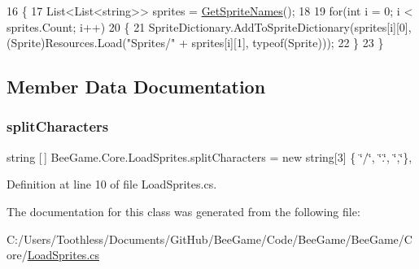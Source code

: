\begin{DoxyCode}
16         \{            
17             List<List<string>> sprites = \hyperlink{class_bee_game_1_1_core_1_1_load_sprites_a3dca64c0b272b40389047ae9722bfcd3}{GetSpriteNames}();
18             
19             \textcolor{keywordflow}{for}(\textcolor{keywordtype}{int} i = 0; i < sprites.Count; i++)
20             \{
21                 SpriteDictionary.AddToSpriteDictionary(sprites[i][0], (Sprite)Resources.Load(\textcolor{stringliteral}{"Sprites/"} + 
      sprites[i][1], typeof(Sprite)));
22             \}
23         \}
\end{DoxyCode}


\subsection{Member Data Documentation}
\mbox{\label{class_bee_game_1_1_core_1_1_load_sprites_aaef6cb35c513009a03c13d1307d5bcba}} 
\subsubsection{\texorpdfstring{split\+Characters}{splitCharacters}}
{\footnotesize\ttfamily string \mbox{[}$\,$\mbox{]} Bee\+Game.\+Core.\+Load\+Sprites.\+split\+Characters = new string\mbox{[}3\mbox{]} \{ \char`\"{}/\char`\"{}, \char`\"{}.\char`\"{}, \char`\"{},\char`\"{}\}\hspace{0.3cm}{\ttfamily [static]}, {\ttfamily [private]}}



Definition at line 10 of file Load\+Sprites.\+cs.



The documentation for this class was generated from the following file\+:\begin{DoxyCompactItemize}
\item 
C\+:/\+Users/\+Toothless/\+Documents/\+Git\+Hub/\+Bee\+Game/\+Code/\+Bee\+Game/\+Bee\+Game/\+Core/\hyperlink{_load_sprites_8cs}{Load\+Sprites.\+cs}\end{DoxyCompactItemize}
